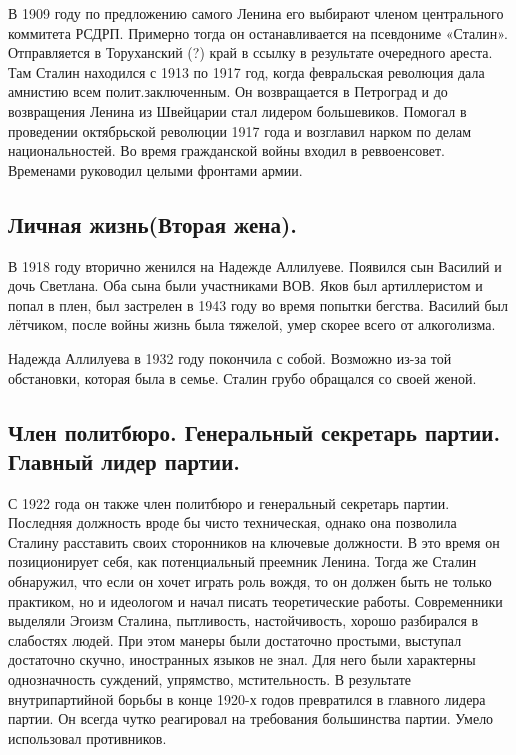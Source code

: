 В 1909 году по предложению самого Ленина его выбирают членом центрального коммитета РСДРП. Примерно тогда он останавливается на псевдониме «Сталин». Отправляется в Торуханский (?) край в ссылку в результате очередного ареста. Там Сталин находился с 1913 по 1917 год, когда февральская революция дала амнистию всем полит.заключенным. Он возвращается в Петроград и до возвращения Ленина из Швейцарии стал лидером большевиков. Помогал в проведении октябрьской революции 1917 года и возглавил нарком по делам национальностей. Во время гражданской войны входил в реввоенсовет. Временами руководил целыми фронтами армии. 

\subsection{Личная жизнь(Вторая жена).}

В 1918 году вторично женился на Надежде Аллилуеве. Появился сын Василий и дочь Светлана. Оба сына были участниками ВОВ. Яков был артиллеристом и попал в плен, был застрелен в 1943 году во время попытки бегства. Василий был лётчиком, после войны жизнь была тяжелой, умер скорее всего от алкоголизма.

Надежда Аллилуева в 1932 году покончила с собой. Возможно из-за той обстановки, которая была в семье. Сталин грубо обращался со своей женой.

\subsection{Член политбюро. Генеральный секретарь партии. Главный лидер партии.}

С 1922 года он также член политбюро и генеральный секретарь партии. Последняя должность вроде бы чисто техническая, однако она позволила Сталину расставить своих сторонников на ключевые должности. В это время он позиционирует себя, как потенциальный преемник Ленина. Тогда же Сталин обнаружил, что если он хочет играть роль вождя, то он должен быть не только практиком, но и идеологом и начал писать теоретические работы. Современники выделяли Эгоизм Сталина, пытливость, настойчивость, хорошо разбирался в слабостях людей. При этом манеры были достаточно простыми, выступал достаточно скучно, иностранных языков не знал. Для него были характерны однозначность суждений, упрямство, мстительность. В результате внутрипартийной борьбы в конце 1920-х годов превратился в главного лидера партии. Он всегда чутко реагировал на требования большинства партии. Умело использовал противников.

